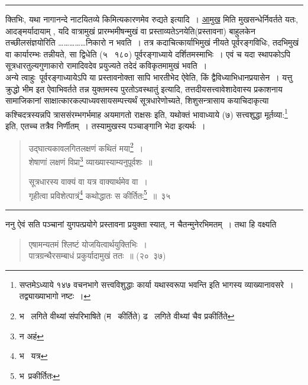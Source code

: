 \documentclass[11pt, openany]{book}
\begin{document}
\hrule

\vspace{2mm}
\noindent
क्तिभिः, यथा नागानन्दे {\qt नाटयितव्ये किमित्यकारणमेव रुद्यते} इत्यादि~। \underline{आमुख} मिति मुखसन्धेर्निवर्तते यतः, आदङ्मर्यादायाम् , यदि वात्रामुखं प्रारम्भमीषन्मुखं वा प्रस्ताव्यतेऽनयेति(प्रस्तावना) बाहुलकेन तच्छीलसंज्ञयोरिति \ldots \ldots \ldots \ldots \ldots निकारो न भवति~। तत्र कदाचित्कार्याभिमुखं नीयते पूर्वरङ्गविधिः, तदभिमुखं वा कार्यारम्भः तन्नीयते, सा द्विधेति (५ \textendash\ १८०) पूर्वरङ्गाध्याये दर्शितमस्माभिः~। एवं च यदा स्थापकोऽपि सूत्रधारतुल्यगुणाकारो रामादिवदेव प्रयुज्यते तदेदं कविकृतमामुखं भवति~।\\

अन्ये त्वाहुः\textendash\ पूर्वरङ्गाध्यायेऽपि या प्रस्तावनोक्ता सापि भारतीभेद ऐवेति, किं द्वैविध्याभिधानप्रयासेन~। यत्तु {\qt क्रुद्धो भीम इत ऐवाभिवर्तते तन्न युक्तमस्य पुरतोऽवस्थातुं} इत्यादि, तत्तदीयसत्त्वावेशादेवास्य प्रकाशनाय सामाजिकानां साक्षात्कारकल्पाध्यवसायसम्पत्त्यर्थं सूत्रधारेणोच्यते, शिशुसन्त्रासाय कयाचिदाकृत्या कश्चिदत्रस्यन्नपि त्राससंरम्भगर्भमाह {\qt अयमागतो राक्षसः} इति, यथोक्तं भावाध्याये (७) {\qt सत्त्वशुद्धा मूर्तव्या:}\renewcommand{\thefootnote}{*}\footnote{सप्तमेऽध्याये १४७ वचनभागे {\qt सत्त्वविशुद्धाः कार्या यथास्वरूपा भवन्ति} इति भागस्य व्याख्यानावसरे~। तद्व्याख्याभागो नष्टः~।} इति, एतच्च तत्रैव निर्णीतम्~। तस्यामुखस्य पञ्चाङ्गानि भेदा इत्यर्थः~।

\newpage

\begin{quote}
{\na उद्घात्यकावलगितलक्षणं कथितं मया\renewcommand{\thefootnote}{1}\footnote{भ \textendash\ लगिते वीथ्यां संपरिभाषिते (म \textendash\ कीर्तिते) ढ \textendash\ लगिते वीथ्यां चैव प्रकीर्तिते}~।\\
शेषाणां लक्षणं विप्रा\renewcommand{\thefootnote}{2}\footnote{न अहं} व्याख्यास्याम्यनुपूर्वशः~॥

सूत्रधारस्य वाक्यं वा यत्र वाक्यार्थमेव वा~।\\
गृहीत्वा प्रविशेत्पात्रं\renewcommand{\thefootnote}{3}\footnote{भ \textendash\ यत्र} कथोद्धातः स कीर्तितः\renewcommand{\thefootnote}{4}\footnote{भ\textendash\ प्रकीर्तितः}~॥~३५}
\end{quote}

\hrule

\vspace{2mm}
ननु ऐवं सति पञ्चानां युगपत्प्रयोगे प्रस्तावना प्रयुक्ता स्यात्, न चैतन्मुनेरभिमतम्~। तथा हि वक्ष्यति\textendash

\begin{quote}
{\qt एषामन्यतमं श्लिष्टं योजयित्वार्थयुक्तिभिः~।\\
पात्रग्रन्थैरसम्बाधं प्रकुर्यादामुखं ततः~॥} (२०\textendash\ ३७)
\end{quote}
\end{document}
